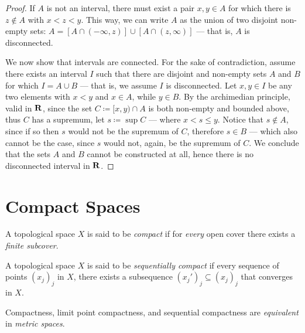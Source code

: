 \begin{proof}
If \(A\) is not an interval, there must exist a pair \(x, y \in A\) for which
there is \(z \notin A\) with \(x < z < y\). This way, we can write \(A\) as the
union of two disjoint non-empty sets: \(A = [A \cap (-\infty, z)] \cup [A \cap
(z, \infty)]\) --- that is, \(A\) is disconnected.

We now show that intervals are connected. For the sake of contradiction, assume
there exists an interval \(I\) such that there are disjoint and non-empty sets
\(A\) and \(B\) for which \(I = A \cup B\) --- that is, we assume \(I\) is
disconnected. Let \(x, y \in I\) be any two elements with \(x < y\) and \(x \in
A\), while \(y \in B\). By the archimedian principle, valid in \(\mathbf{R}\), since the
set \(C \coloneq [x, y) \cap A\) is both non-empty and bounded above, thus \(C\)
has a supremum, let \(s \coloneq \sup C\) --- where \(x < s \leq y\). Notice
that \(s \notin A\), since if so then \(s\) would not be the supremum of \(C\),
therefore \(s \in B\) --- which also cannot be the case, since \(s\) would not,
again, be the supremum of \(C\). We conclude that the sets \(A\) and \(B\)
cannot be constructed at all, hence there is no disconnected interval in \(\mathbf{R}\).
\end{proof}

\section{Compact Spaces}

\begin{definition}
\label{def:compact-space}
A topological space \(X\) is said to be \emph{compact} if for \emph{every} open
cover there exists a \emph{finite subcover}.
\end{definition}

\begin{definition}
\label{def:sequentially-compact}
A topological space \(X\) is said to be \emph{sequentially compact} if every
sequence of points \((x_j)_j\) in \(X\), there exists a subsequence \((x_j')_j
\subseteq (x_j)_j\) that converges in \(X\).
\end{definition}

\begin{proposition}
\label{prop:metric-space-compactness-equivalences}
Compactness, limit point compactness, and sequential compactness are
\emph{equivalent} in \emph{metric spaces}.
\end{proposition}

